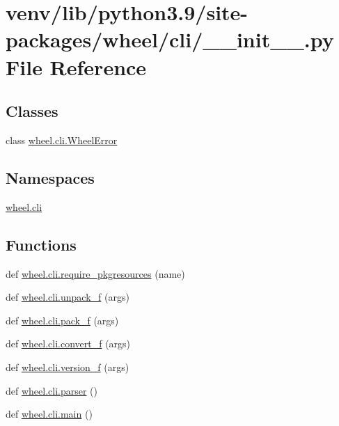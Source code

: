 \hypertarget{venv_2lib_2python3_89_2site-packages_2wheel_2cli_2____init_____8py}{}\section{venv/lib/python3.9/site-\/packages/wheel/cli/\+\_\+\+\_\+init\+\_\+\+\_\+.py File Reference}
\label{venv_2lib_2python3_89_2site-packages_2wheel_2cli_2____init_____8py}
\subsection*{Classes}
\begin{DoxyCompactItemize}
\item 
class \hyperlink{classwheel_1_1cli_1_1WheelError}{wheel.\+cli.\+Wheel\+Error}
\end{DoxyCompactItemize}
\subsection*{Namespaces}
\begin{DoxyCompactItemize}
\item 
 \hyperlink{namespacewheel_1_1cli}{wheel.\+cli}
\end{DoxyCompactItemize}
\subsection*{Functions}
\begin{DoxyCompactItemize}
\item 
def \hyperlink{namespacewheel_1_1cli_a0eedbfc56bb01006797f610f2e59d20b}{wheel.\+cli.\+require\+\_\+pkgresources} (name)
\item 
def \hyperlink{namespacewheel_1_1cli_aee976c2bcf67303a42567f1924c9a222}{wheel.\+cli.\+unpack\+\_\+f} (args)
\item 
def \hyperlink{namespacewheel_1_1cli_aa647993da58a45ca360ff98d241cd8a8}{wheel.\+cli.\+pack\+\_\+f} (args)
\item 
def \hyperlink{namespacewheel_1_1cli_a0433140019e2a2689c1a3526bb73e716}{wheel.\+cli.\+convert\+\_\+f} (args)
\item 
def \hyperlink{namespacewheel_1_1cli_a27f0083c5bf61185d7daf8ee856aa82c}{wheel.\+cli.\+version\+\_\+f} (args)
\item 
def \hyperlink{namespacewheel_1_1cli_a8ecdd081a63782cd5cfe77d6a7f5e8ab}{wheel.\+cli.\+parser} ()
\item 
def \hyperlink{namespacewheel_1_1cli_a920eff645c9f0a1cbe67a7733517f030}{wheel.\+cli.\+main} ()
\end{DoxyCompactItemize}
